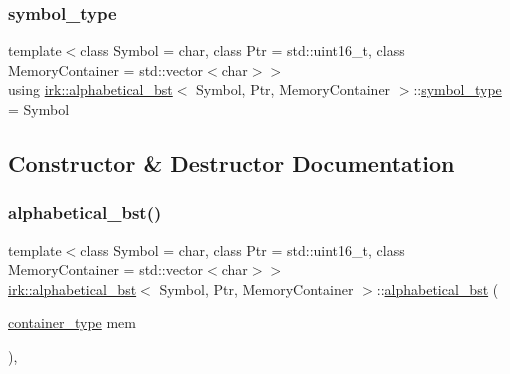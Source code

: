 \subsubsection{\texorpdfstring{symbol\+\_\+type}{symbol\_type}}
{\footnotesize\ttfamily template$<$class Symbol = char, class Ptr = std\+::uint16\+\_\+t, class Memory\+Container = std\+::vector$<$char$>$$>$ \\
using \mbox{\hyperlink{classirk_1_1alphabetical__bst}{irk\+::alphabetical\+\_\+bst}}$<$ Symbol, Ptr, Memory\+Container $>$\+::\mbox{\hyperlink{classirk_1_1alphabetical__bst_a296ccb8fa9fa9dce3b3c3beab0a5ca28}{symbol\+\_\+type}} =  Symbol}



\subsection{Constructor \& Destructor Documentation}
\mbox{\label{classirk_1_1alphabetical__bst_a21a5c2844dc3bf7bb86e6fa86df2c4c4}} 
\subsubsection{\texorpdfstring{alphabetical\+\_\+bst()}{alphabetical\_bst()}\hspace{0.1cm}{\footnotesize\ttfamily [1/4]}}
{\footnotesize\ttfamily template$<$class Symbol = char, class Ptr = std\+::uint16\+\_\+t, class Memory\+Container = std\+::vector$<$char$>$$>$ \\
\mbox{\hyperlink{classirk_1_1alphabetical__bst}{irk\+::alphabetical\+\_\+bst}}$<$ Symbol, Ptr, Memory\+Container $>$\+::\mbox{\hyperlink{classirk_1_1alphabetical__bst}{alphabetical\+\_\+bst}} (\begin{DoxyParamCaption}\item[{\mbox{\hyperlink{classirk_1_1alphabetical__bst_aeed9efc6a48ff6d504a608e06223f386}{container\+\_\+type}}}]{mem }\end{DoxyParamCaption})\hspace{0.3cm}{\ttfamily [inline]}, {\ttfamily [explicit]}}

\mbox{\label{classirk_1_1alphabetical__bst_aa4c4b01aac537a6cf70dba71002e1f7d}} 
